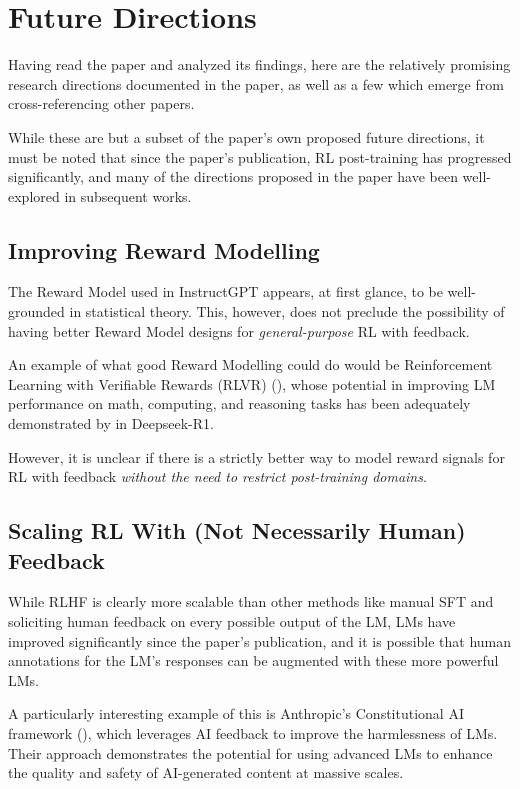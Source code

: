 \documentclass{article} %
\begin{document}
\section{Future Directions}

Having read the paper and analyzed its findings, here are the
relatively promising research directions documented in the paper,
as well as a few which emerge from cross-referencing other papers.

While these are but a subset of the paper's own proposed
future directions, it must be noted that since the paper's publication,
RL post-training has progressed significantly, and many of the
directions proposed in the paper have been well-explored in subsequent works.

\subsection{Improving Reward Modelling}
The Reward Model used in InstructGPT appears, at first glance,
to be well-grounded in statistical theory. This, however, does not preclude
the possibility of having better Reward Model designs for \textit{general-purpose} RL with
feedback.

An example of what good Reward Modelling could do would be Reinforcement Learning with
Verifiable Rewards (RLVR) (\cite{Lambert-et-al-2024}), whose potential
in improving LM performance on math, computing, and reasoning tasks
has been adequately demonstrated by \cite{Deepseek-2025} in Deepseek-R1.

However, it is unclear if there is a strictly better way to
model reward signals for RL with feedback 
\textit{without the need to restrict post-training domains}.

\subsection{Scaling RL With (Not Necessarily Human) Feedback}
While RLHF is clearly more scalable than other methods like 
manual SFT and soliciting human feedback on every possible output of the LM,
LMs have improved significantly since the paper's publication, and
it is possible that human annotations for the LM's responses
can be augmented with these more powerful LMs.

A particularly interesting example of this is Anthropic's Constitutional AI framework
(\cite{Bai-et-al-2022}), which leverages AI feedback to improve the harmlessness of LMs. 
Their approach demonstrates the potential for using advanced LMs to enhance the quality and safety of AI-generated content
at massive scales.
\end{document}
